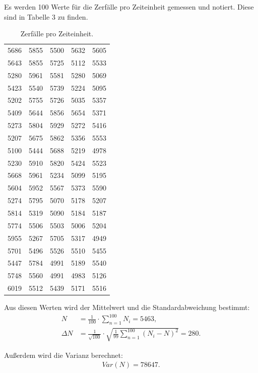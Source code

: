 Es werden 100 Werte für die Zerfälle pro Zeiteinheit gemessen und notiert. Diese sind in Tabelle 3 zu finden.
\begin{table}[H]
  \centering
  \caption{Zerfälle pro Zeiteinheit.}
  \label{tab:Parameter}
  \begin{tabular}{c c c c c}
    \bottomrule
     5686&5855 &5500&5632&5605 \\
     5643&5855 &5725   &5112&5533 \\
     5280&5961  &5581  &5280&5069 \\
     5423&5540  &5739  &5224 &5095 \\
     5202&5755  &5726  &5035 &5357 \\
     5409&5644  &5856  &5654   &5371 \\
     5273&5804  &5929  &5272     &5416 \\
     5207&5675  &5862  &5356     &5553 \\
     5100&5444  &5688  &5219     &4978 \\
     5230&5910  &5820  &5424     &5523 \\
     5668&5961  &5234  &5099     &5195 \\
     5604&5952  &5567  &5373     &5590 \\
     5274&5795  &5070  &5178     &5207 \\
     5814&5319  &5090  &5184     &5187 \\
     5774&5506  &5503  &5006     &5204 \\
     5955&5267  &5705  &5317     &4949 \\
     5701&5496  &5526  &5510 &5455 \\
     5447&5784  &4991  &5189     &5540 \\
     5748&5560  &4991  &4983     &5126 \\
     6019&5512  &5439  &5171     &5516 \\
  \bottomrule
  \end{tabular}
\end{table}

\noindent Aus diesen Werten wird der Mittelwert und die Standardabweichung bestimmt:
\begin{align*}
N &= \frac{1}{100}\cdot \sum_{n=1}^{100} N_i = 5463, \\
\Delta N &=\frac{1}{\sqrt{100}} \cdot \sqrt{\frac{1}{99} \sum_{n=1}^{100} (N_i - N)^2} = 280.
\end{align*}

\noindent Außerdem wird die Varianz berechnet:
\begin{align*}
Var(N) = 78647 .
\end{align*}

